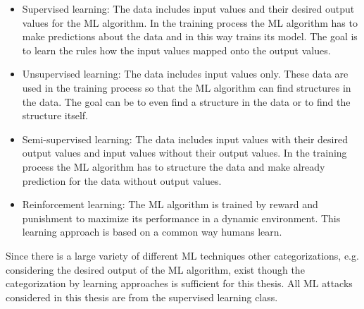 \begin{itemize}
\item Supervised learning: The data includes input values and their desired output values for the \ac{ML} algorithm. 
In the training process the \ac{ML} algorithm has to make predictions about the data and in this way trains its model.
The goal is to learn the rules how the input values mapped onto the output values.
\item Unsupervised learning: The data includes input values only.
These data are used in the training process so that the \ac{ML} algorithm can find structures in the data.
The goal can be to even find a structure in the data or to find the structure itself.
\item Semi-supervised learning: The data includes input values with their desired output values and input values without their output values. %
In the training process the \ac{ML} algorithm has to structure the data and make already prediction for the data without output values.
\item Reinforcement learning: The \ac{ML} algorithm is trained by reward and punishment to maximize its performance in a dynamic environment.
This learning approach is based on a common way humans learn.
\end{itemize}

Since there is a large variety of different \ac{ML} techniques other categorizations, e.g. considering the desired output of the \ac{ML} algorithm, exist though the categorization by learning approaches is sufficient for this thesis. %
All \ac{ML} attacks considered in this thesis are from the supervised learning class.








